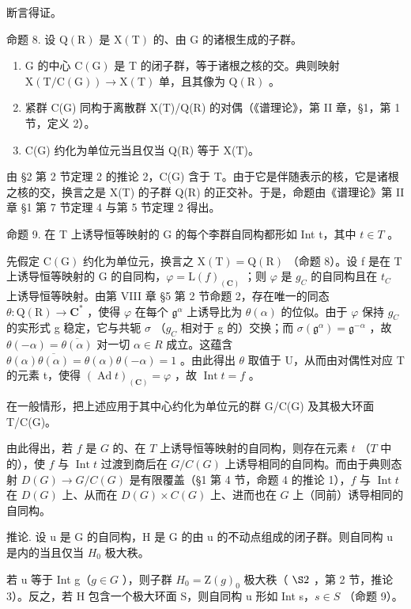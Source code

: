 断言得证。

命题 8. 设 \(\mathrm{Q}(\mathrm{R})\) 是 \(\mathrm{X}(\mathrm{T})\) 的、由 \(\mathrm{G}\) 的诸根生成的子群。

\begin{enumerate}
\def\labelenumi{\alph{enumi})}
\item
  G 的中心 \(\mathrm{C}(\mathrm{G})\) 是 T 的闭子群，等于诸根之核的交。典则映射 \(\mathrm{X}(\mathrm{T}/\mathrm{C}(\mathrm{G})) \to \mathrm{X}(\mathrm{T})\) 单，且其像为 \(\mathrm{Q}(\mathrm{R})\) 。
\item
  紧群 C(G) 同构于离散群 X(T)/Q(R) 的对偶（《谱理论》，第 II 章，§1，第 1 节，定义 2）。
\item
  C(G) 约化为单位元当且仅当 Q(R) 等于 X(T)。
\end{enumerate}

由 §2 第 2 节定理 2 的推论 2，C(G) 含于 T。由于它是伴随表示的核，它是诸根之核的交，换言之是 X(T) 的子群 Q(R) 的正交补。于是，命题由《谱理论》第 II 章 §1 第 7 节定理 4 与第 5 节定理 2 得出。

命题 9. 在 T 上诱导恒等映射的 G 的每个李群自同构都形如 Int t，其中 \(t \in T\) 。

先假定 \(\mathrm{C}(\mathrm{G})\) 约化为单位元，换言之 \(\mathrm{X}(\mathrm{T}) = \mathrm{Q}(\mathrm{R})\) （命题 8）。设 f 是在 T 上诱导恒等映射的 G 的自同构，\(\varphi = \mathrm{L}(f)_{(\mathbf{C})}\) ；则 \(\varphi\) 是 \(g_{C}\) 的自同构且在 \(t_{C}\) 上诱导恒等映射。由第 VIII 章 §5 第 2 节命题 2，存在唯一的同态 \(\theta : \mathrm{Q}(\mathrm{R}) \to \mathbf{C}^{*}\) ，使得 \(\varphi\) 在每个 \(\mathfrak{g}^{\alpha}\) 上诱导比为 \(\theta(\alpha)\) 的位似。由于 \(\varphi\) 保持 \(g_{C}\) 的实形式 g 稳定，它与共轭 \(\sigma\) （\(g_{C}\) 相对于 g 的）交换；而 \(\sigma(\mathfrak{g}^{\alpha}) = \mathfrak{g}^{-\alpha}\) ，故 \(\theta(-\alpha) = \overline{\theta(\alpha)}\) 对一切 \(\alpha \in R\) 成立。这蕴含 \(\theta(\alpha)\overline{\theta(\alpha)} = \theta(\alpha)\theta(-\alpha) = 1\) 。由此得出 \(\theta\) 取值于 U，从而由对偶性对应 T 的元素 t，使得 \((\operatorname{Ad} t)_{(\mathbf{C})} = \varphi\) ，故 \(\operatorname{Int} t = f\) 。

在一般情形，把上述应用于其中心约化为单位元的群 G/C(G) 及其极大环面 T/C(G)。

由此得出，若 \(f\) 是 \(G\) 的、在 \(T\) 上诱导恒等映射的自同构，则存在元素 \(t\) （\(T\) 中的），使 \(f\) 与 \(\operatorname{Int} t\) 过渡到商后在 \(G / C(G)\) 上诱导相同的自同构。而由于典则态射 \(D(G) \to G / C(G)\) 是有限覆盖（§1 第 4 节，命题 4 的推论 1），\(f\) 与 \(\operatorname{Int} t\) 在 \(D(G)\) 上、从而在 \(D(G) \times C(G)\) 上、进而也在 \(G\) 上（同前）诱导相同的自同构。

推论. 设 u 是 G 的自同构，H 是 G 的由 u 的不动点组成的闭子群。则自同构 u 是内的当且仅当 \(H_{0}\) 极大秩。

若 u 等于 Int g（\(g \in G\) ），则子群 \(H_{0} = \mathrm{Z}(g)_{0}\) 极大秩（ \(\S2\) ，第 2 节，推论 3）。反之，若 H 包含一个极大环面 S，则自同构 u 形如 Int s，\(s \in S\) （命题 9）。